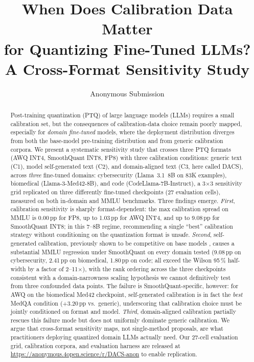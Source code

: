 \documentclass[11pt]{article}
\title{When Does Calibration Data Matter\\
for Quantizing Fine-Tuned LLMs?\\
A Cross-Format Sensitivity Study}
\author{Anonymous Submission}
\date{}
\newcommand{\dacs}{DACS}
\begin{document}
\twocolumn[
  \maketitle
  \vspace{0.5em}
]

\begin{abstract}
\begin{sloppypar}
Post-training quantization (PTQ) of large language models (LLMs) requires a
small calibration set, but the consequences of calibration-data choice remain
poorly mapped, especially for \emph{domain fine-tuned} models, where the
deployment distribution diverges from both the base-model pre-training
distribution and from generic calibration corpora.  We present a systematic
sensitivity study that crosses three PTQ formats (AWQ INT4, SmoothQuant INT8,
FP8) with three calibration conditions: generic text (C1), model
self-generated text (C2), and domain-aligned text (C3, here called \dacs{}),
across \emph{three} fine-tuned domains: cybersecurity (Llama~3.1~8B on 83K
examples), biomedical (Llama-3-Med42-8B), and code (CodeLlama-7B-Instruct),
a 3$\times$3 sensitivity grid replicated on three differently fine-tuned checkpoints (27 evaluation cells), measured on both in-domain and MMLU benchmarks.
Three findings emerge.  \emph{First}, calibration sensitivity is sharply
format-dependent: the max calibration spread on MMLU is 0.00\,pp for FP8,
up to 1.03\,pp for AWQ INT4, and up to 9.08\,pp for SmoothQuant INT8;
in this 7--8B regime, recommending a single ``best'' calibration
strategy without conditioning on the quantization format is unsafe.  \emph{Second}, self-generated
calibration, previously shown to be competitive on base models
\citep{williams2025selfcalib}, causes a substantial MMLU regression under
SmoothQuant on every domain tested (9.08\,pp on cybersecurity, 2.41\,pp on
biomedical, 1.80\,pp on code; all exceed the Wilson 95\,\% half-width by a
factor of 2--11$\times$), with the rank ordering across the three checkpoints consistent with a domain-narrowness scaling hypothesis we cannot definitively test from three confounded data points.  The
failure is SmoothQuant-specific, however: for AWQ on the biomedical Med42
checkpoint, self-generated calibration is in fact the \emph{best} MedQA
condition ($+$3.20\,pp vs.\ generic), underscoring that calibration choice
must be jointly conditioned on format and model.  \emph{Third}, domain-aligned
calibration partially rescues this failure mode but does not uniformly
dominate generic calibration.
We argue that cross-format sensitivity maps, not single-method proposals, are
what practitioners deploying quantized domain LLMs actually need.  Our
27-cell evaluation grid, calibration corpora, and evaluation harness are
released at \url{https://anonymous.4open.science/r/DACS-anon} to enable
replication.
\end{sloppypar}
\end{abstract}
\end{document}
